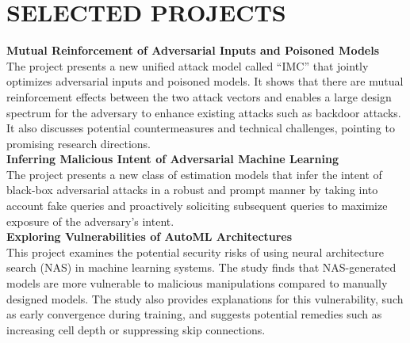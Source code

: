 \documentclass[letterpaper,11pt]{article}
\begin{document}
\section{SELECTED PROJECTS}
\textbf{Mutual Reinforcement of Adversarial Inputs and Poisoned Models}\\
The project presents a new unified attack model called ``IMC'' that jointly optimizes adversarial inputs and poisoned models. It shows that there are mutual reinforcement effects between the two attack vectors and enables a large design spectrum for the adversary to enhance existing attacks such as backdoor attacks. It also discusses potential countermeasures and technical challenges, pointing to promising research directions. \vspace{0.8em}\\
\textbf{Inferring Malicious Intent of Adversarial Machine Learning}\\
The project presents a new class of estimation models that infer the intent of black-box adversarial attacks in a robust and prompt manner by taking into account fake queries and proactively soliciting subsequent queries to maximize exposure of the adversary's intent. \vspace{0.8em}\\
\textbf{Exploring Vulnerabilities of AutoML Architectures}\\
This project examines the potential security risks of using neural architecture search (NAS) in machine learning systems. The study finds that NAS-generated models are more vulnerable to malicious manipulations compared to manually designed models. The study also provides explanations for this vulnerability, such as early convergence during training, and suggests potential remedies such as increasing cell depth or suppressing skip connections. \vspace{0.8em}\\
\end{document}
